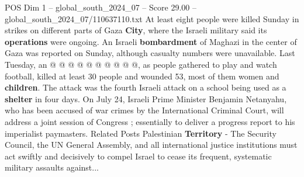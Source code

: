 \begin{textsample}{POS Dim 1 – global\_south\_2024\_07 – Score 29.00 – global\_south\_2024\_07/110637110.txt}
At least eight people were killed Sunday in strikes on different parts of Gaza \textbf{City}, where the Israeli military said its \textbf{operations} were ongoing.
An Israeli \textbf{bombardment} of Maghazi in the center of Gaza was reported on Sunday, although casualty numbers were unavailable.
Last Tuesday, an @ @ @ @ @ @ @ @ @ @, as people gathered to play and watch football, killed at least 30 people and wounded 53, most of them women and \textbf{children}.
The attack was the fourth Israeli attack on a school being used as a \textbf{shelter} in four days.
On July 24, Israeli Prime Minister Benjamin Netanyahu, who has been accused of war crimes by the International Criminal Court, will address a joint session of Congress ; essentially to deliver a progress report to his imperialist paymasters.
Related Posts Palestinian \textbf{Territory} - The Security Council, the UN General Assembly, and all international justice institutions must act swiftly and decisively to compel Israel to cease its frequent, systematic military assaults against...

\end{textsample}
